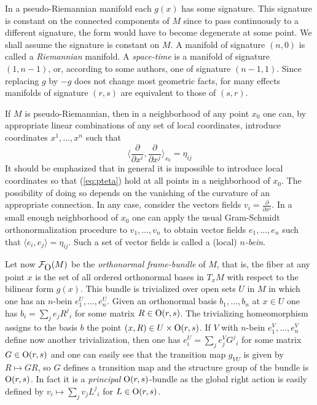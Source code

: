 \documentclass[12pt,titlepage]{article}
\def\cF{{\cal F}}
\def\O{\hbox{O}}
\def\ppv#1#2{\frac{\partial}{\partial #1^#2}}
\begin{document}
In a pseudo-Riemannian manifold each \(g(x)\) has some signature. This
signature is constant on the connected components of \(M\) since to pass
continuously to
a different signature, the form would have to become degenerate at some
point. We shall assume the signature is constant on \(M\). A manifold of
signature \((n,0)\) is called a {\em Riemannian\/}
%
 manifold. A
{\em space-time\/}
%
 is a manifold of signature \((1, n-1)\), or, according
to some authors, one of signature \((n-1,1)\). Since replacing 
\(g\) by \(-g\) does not change most geometric facts, for many effects  
manifolds of signature \((r,s)\) are equivalent to
those of \((s,r)\).

If \(M\) is pseudo-Riemannian, then in a neighborhood of any point \(x_0\)
one
can, by appropriate linear combinations of any set of local coordinates, 
introduce  coordinates \(x^1,\dots,x^n\) such that
\begin{equation}\label{eq:pteta}%
\langle\ppv{x}{i}, \ppv{x}{j}\rangle_{x_0}=\eta_{ij}
\end{equation}%
It should be emphasized that in general it is impossible to introduce
local coordinates so that (\ref{eq:pteta}) hold at all points in a
neighborhood of \(x_0\). The possibility of doing so depends on the
vanishing of the curvature of an appropriate connection.
In any case, consider the vectors fields \(v_i = \ppv{x}{i}\).
 In a small enough neighborhood of \(x_0\) one can apply the
usual Gram-Schmidt orthonormalization procedure to \(v_1,\dots,v_n\)
to obtain vector
fields \(e_1,\dots,e_n\) such that \(\langle e_i,e_j \rangle = \eta_{ij}\). Such a
set of vector fields is called a (local) 
%
{\em \(n\)-bein\/}.

Let now \(\cF_{\O}(M)\)
\index{\(F_O(M)\)@\(\cF_{\O}(M)\)}%
be the {\em orthonormal frame-bundle\/}
%
 of \(M\),
that is, the fiber at any point \(x\) is the set of all ordered
orthonormal bases
in \(T_xM\) with respect to the bilinear form \(g(x)\). This bundle is
trivialized over open sets \(U\) in \(M\) in which one has an
\(n\)-bein \(e^U_1,\dots,e^U_n\). Given an orthonormal basis
\(b_1,\dots,b_n\) at \(x\in U\) one has \(b_i = \sum_j e_j R^j{}_i\) for
some matrix \(R\in \O(r,s)\). The trivializing homeomorphism assigns
to the basis \(b\) the point \((x,R) \in U \times \O(r,s)\). If \(V\)
with \(n\)-bein \(e^V_1,\dots,e^V_n\) define now another trivialization,
then one has \(e^U_i = \sum_je^V_j G^j{}_i\) for some matrix \(G \in
\O(r,s)\)
and one can easily see that the transition map \(g_{VU}\) is given by
\(R \mapsto GR\), so \(G\) defines a transition map and the structure group
of the bundle is \(\O(r,s)\). In fact it is a {\em principal\/}
\(\O(r,s)\)-bundle as the global right action is easily defined by \(v_i
\mapsto \sum_j v_j L^j{}_i\) for \(L\in \O(r,s)\).
\end{document}
